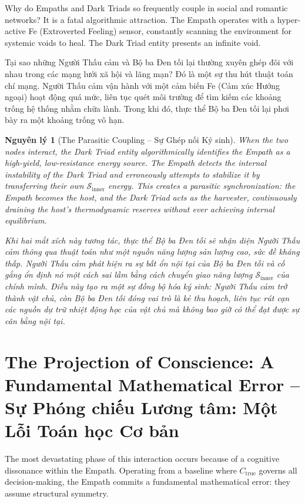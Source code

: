 \documentclass{report}
\newtheorem{nguyenly}{Nguyên lý}
\begin{document}
Why do Empaths and Dark Triads so frequently couple in social and romantic networks? It is a fatal algorithmic attraction. The Empath operates with a hyper-active Fe (Extroverted Feeling) sensor, constantly scanning the environment for systemic voids to heal. The Dark Triad entity presents an infinite void.

Tại sao những Người Thấu cảm và Bộ ba Đen tối lại thường xuyên ghép đôi với nhau trong các mạng lưới xã hội và lãng mạn? Đó là một sự thu hút thuật toán chí mạng. Người Thấu cảm vận hành với một cảm biến Fe (Cảm xúc Hướng ngoại) hoạt động quá mức, liên tục quét môi trường để tìm kiếm các khoảng trống hệ thống nhằm chữa lành. Trong khi đó, thực thể Bộ ba Đen tối lại phơi bày ra một khoảng trống vô hạn.

\begin{nguyenly}[The Parasitic Coupling -- Sự Ghép nối Ký sinh]
	When the two nodes interact, the Dark Triad entity algorithmically identifies the Empath as a high-yield, low-resistance energy source. The Empath detects the internal instability of the Dark Triad and erroneously attempts to stabilize it by transferring their own $\mathcal{S}_{\text{inner}}$ energy. This creates a parasitic synchronization: the Empath becomes the host, and the Dark Triad acts as the harvester, continuously draining the host's thermodynamic reserves without ever achieving internal equilibrium.
	
	Khi hai mắt xích này tương tác, thực thể Bộ ba Đen tối sẽ nhận diện Người Thấu cảm thông qua thuật toán như một nguồn năng lượng sản lượng cao, sức đề kháng thấp. Người Thấu cảm phát hiện ra sự bất ổn nội tại của Bộ ba Đen tối và cố gắng ổn định nó một cách sai lầm bằng cách chuyển giao năng lượng $\mathcal{S}_{\text{inner}}$ của chính mình. Điều này tạo ra một sự đồng bộ hóa ký sinh: Người Thấu cảm trở thành vật chủ, còn Bộ ba Đen tối đóng vai trò là kẻ thu hoạch, liên tục rút cạn các nguồn dự trữ nhiệt động học của vật chủ mà không bao giờ có thể đạt được sự cân bằng nội tại.
\end{nguyenly}

\section{The Projection of Conscience: A Fundamental Mathematical Error -- Sự Phóng chiếu Lương tâm: Một Lỗi Toán học Cơ bản}

The most devastating phase of this interaction occurs because of a cognitive dissonance within the Empath. Operating from a baseline where $C_{\text{true}}$ governs all decision-making, the Empath commits a fundamental mathematical error: they assume structural symmetry.
\end{document}
